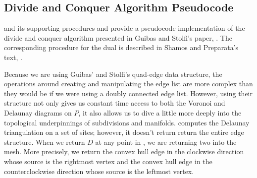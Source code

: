 \documentclass[12pt,twoside]{reedthesis}
\begin{document}
    \clearpage


  \subsection{Divide and Conquer Algorithm Pseudocode} %
  \label{sub:divide_and_conquer_algorithm_pseudocode}
     and its supporting procedures  and  provide a pseudocode implementation of the divide and conquer algorithm presented in Guibas and Stolfi's paper, \citealp{guibas}. The corresponding procedure for the dual is described in Shamos and Preparata's text, \citealp{shamos}.\par

    Because we are using Guibas’ and Stolfi’s quad-edge data structure, the operations around creating and manipulating the edge list are more complex than they would be if we were using a doubly connected edge list. However, using their structure not only gives us constant time access to both the Voronoi and Delaunay diagrams on $P$, it also allows us to dive a little more deeply into the topological underpinnings of subdivisions and manifolds.   computes the Delaunay triangulation on a set of sites; however, it doesn’t return return the entire edge structure. When we return $D$ at any point in , we are returning two  into the mesh. More precisely, we return the convex hull edge in the clockwise direction whose source is the rightmost vertex and the convex hull edge in the counterclockwise direction whose source is the leftmost vertex.\par
    
\end{document}
